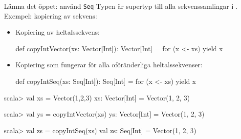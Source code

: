\begin{Slide}{Lämna det öppet: använd \texttt{Seq}}\SlideFontSmall
Typen  är supertyp till alla sekvenssamlingar i .
\pause Exempel: kopiering av sekvens:
\begin{itemize}
\item Kopiering av  heltalssekvens:
\begin{Code}
def copyIntVector(xs: Vector[Int]): Vector[Int] = for (x <- xs) yield x
\end{Code}

\item Kopiering som fungerar för alla oföränderliga heltalssekvenser:
\begin{Code}
def copyIntSeq(xs: Seq[Int]): Seq[Int] = for (x <- xs) yield x
\end{Code}
\end{itemize}
\pause
\begin{REPL}
scala> val xs = Vector(1,2,3)
xs: Vector[Int] = Vector(1, 2, 3)

scala> val ys = copyIntVector(xs)
ys: Vector[Int] = Vector(1, 2, 3)

scala> val zs = copyIntSeq(xs)
val zs: Seq[Int] = Vector(1, 2, 3)
\end{REPL}
%
%
\end{Slide}
  
